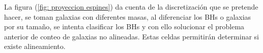La figura (\ref{fig: proyeccion espines}) da cuenta de la discretización que se pretende hacer, se toman galaxias con diferentes masas, al diferenciar los BHs o galaxias por su tamaño, se intenta clasificar los BHs y con ello solucionar el problema anterior de conteo de galaxias no alineadas. Estas celdas permitirán determinar si existe alineamiento.

\begin{figure} 
\centering {} 

\end{figure}
